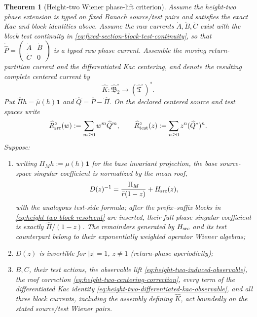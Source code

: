 \documentclass[11pt]{article}
\newtheorem{theorem}{Theorem}[section]
\newcommand{\one}{\mathbf 1}
\begin{document}
\begin{theorem}[Height-two Wiener phase-lift criterion]
\label{thm:finite-return-Wiener-CM2}
Assume the height-two phase extension is typed on fixed Banach source/test
pairs and satisfies the exact Kac and block identities above.  Assume the
raw currents $\dot A,\dot B,\dot C$ exist with the block test continuity in
\eqref{eq:fixed-section-block-test-continuity}, so that
$\dot{\widehat P}=\left(\begin{smallmatrix}\dot A&\dot B\\
\dot C&0\end{smallmatrix}\right)$ is a typed raw phase current.  Assemble
the moving return-partition current and the differentiated Kac centering,
and denote the resulting complete centered current by
\[
 \widehat K:\widehat{\mathfrak B}_2^{\circ}
 \longrightarrow(\widehat{\mathfrak T}^{\circ})^*.
\]
Put $\widehat\Pi h=\widehat\mu(h)\one$ and
$\widehat Q=\widehat P-\widehat\Pi$.  On the declared centered source and
test spaces write
\begin{equation}
\label{eq:height-two-left-right-resolvents}
 \widehat R_{\rm src}^{\circ}(w)
 :=\sum_{m\ge0}w^m\widehat Q^m,
 \qquad
 \widehat R_{\rm test}^{\circ}(z)
 :=\sum_{n\ge0}z^n(\widehat Q^*)^n.
\end{equation}
Suppose:
\begin{enumerate}[label=\textup{(RW\arabic*)}]
\item writing $\Pi_Mh:=\mu(h)\one$ for the base invariant projection, the
      base source-space singular coefficient is normalized by the mean roof,
      \[
       D(z)^{-1}=\frac{\Pi_M}{\bar r(1-z)}+H_{\rm src}(z),
      \]
      with the analogous test-side formula; after the prefix--suffix blocks
      in \eqref{eq:height-two-block-resolvent} are inserted, their full phase
      singular coefficient is exactly $\widehat\Pi/(1-z)$.  The remainders
      generated by $H_{\rm src}$ and its test counterpart belong to their
      exponentially weighted operator Wiener algebras;
\item $D(z)$ is invertible for $|z|=1$, $z\ne1$ (return-phase
      aperiodicity);
\item $B,C$, their test actions, the observable lift
      \eqref{eq:height-two-induced-observable}, the roof correction
      \eqref{eq:height-two-centering-correction}, every term of the
      differentiated Kac identity
      \eqref{eq:height-two-differentiated-kac-observable}, and all three
      block currents, including the assembly defining $\widehat K$, act
      boundedly on the stated source/test Wiener pairs.

\end{enumerate}
\end{theorem}
\end{document}
